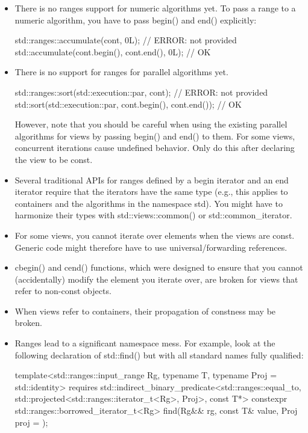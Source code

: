 \begin{itemize}
\item
There is no ranges support for numeric algorithms yet. To pass a range to a numeric algorithm, you have to pass begin() and end() explicitly:

\begin{cpp}
std::ranges::accumulate(cont, 0L); // ERROR: not provided
std::accumulate(cont.begin(), cont.end(), 0L); // OK
\end{cpp}

\item
There is no support for ranges for parallel algorithms yet.

\begin{cpp}
std::ranges::sort(std::execution::par, cont); // ERROR: not provided
std::sort(std::execution::par, cont.begin(), cont.end()); // OK
\end{cpp}

However, note that you should be careful when using the existing parallel algorithms for views by passing begin() and end() to them. For some views, concurrent iterations cause undefined behavior. Only do this after declaring the view to be const.

\item
Several traditional APIs for ranges defined by a begin iterator and an end iterator require that the iterators have the same type (e.g., this applies to containers and the algorithms in the namespace std). You might have to harmonize their types with std::views::common() or std::common\_iterator.

\item
For some views, you cannot iterate over elements when the views are const. Generic code might therefore have to use universal/forwarding references.

\item
cbegin() and cend() functions, which were designed to ensure that you cannot (accidentally) modify the element you iterate over, are broken for views that refer to non-const objects.

\item
When views refer to containers, their propagation of constness may be broken.

\item
Ranges lead to a significant namespace mess. For example, look at the following declaration of std::find() but with all standard names fully qualified:

\begin{cpp}
template<std::ranges::input_range Rg,
				typename T,
				typename Proj = std::identity>
requires std::indirect_binary_predicate<std::ranges::equal_to,
									std::projected<std::ranges::iterator_t<Rg>, Proj>,
									const T*>
constexpr std::ranges::borrowed_iterator_t<Rg>
	find(Rg&& rg, const T& value, Proj proj = {});
\end{cpp}


\end{itemize}
